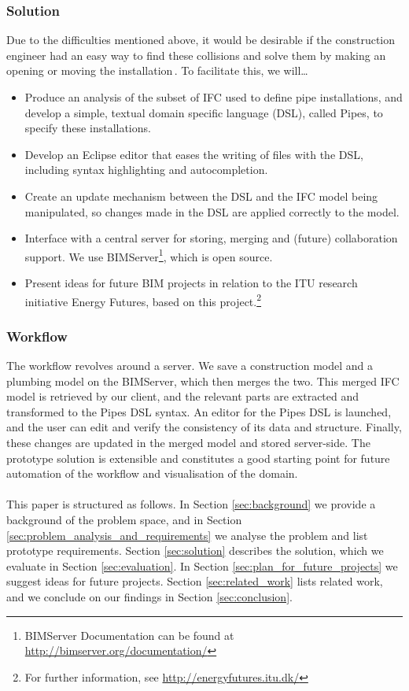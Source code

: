 \subsubsection{Solution}
Due to the difficulties mentioned above, it would be desirable if the construction engineer had an easy way to find these collisions and solve them by making an opening or moving the installation\,\cite{jorgensen12}. To facilitate this, we will\ldots
\begin{itemize}
\item Produce an analysis of the subset of IFC used to define pipe installations, and develop a simple, textual domain specific language (DSL), called Pipes, to specify these installations.
\item Develop an Eclipse editor that eases the writing of files with the DSL, including syntax highlighting and autocompletion.
\item Create an update mechanism between the DSL and the IFC model being manipulated, so changes made in the DSL are applied correctly to the model.
\item Interface with a central server for storing, merging and (future) collaboration support. We use BIMServer\footnote{BIMServer Documentation can be found at \url{http://bimserver.org/documentation/}}, which is open source.
\item Present ideas for future BIM projects in relation to the ITU research initiative Energy Futures, based on this project.\footnote{For further information, see \url{http://energyfutures.itu.dk/}}
\end{itemize}

\subsubsection{Workflow}
\label{sec:workflow}
The workflow revolves around a server. We save a construction model and a plumbing model on the BIMServer, which then merges the two. This merged IFC model is retrieved by our client, and the relevant parts are extracted and transformed to the Pipes DSL syntax. An editor for the Pipes DSL is launched, and the user can edit and verify the consistency of its data and structure. Finally, these changes are updated in the merged model and stored server-side. The prototype solution is extensible and constitutes a good starting point for future automation of the workflow and visualisation of the domain.

\paragraph{}
This paper is structured as follows. In Section \ref{sec:background} we provide a background of the problem space, and in Section \ref{sec:problem_analysis_and_requirements} we analyse the problem and list prototype requirements. Section \ref{sec:solution} describes the solution, which we evaluate in Section \ref{sec:evaluation}. In Section \ref{sec:plan_for_future_projects} we suggest ideas for future projects. Section \ref{sec:related_work} lists related work, and we conclude on our findings in Section \ref{sec:conclusion}.
